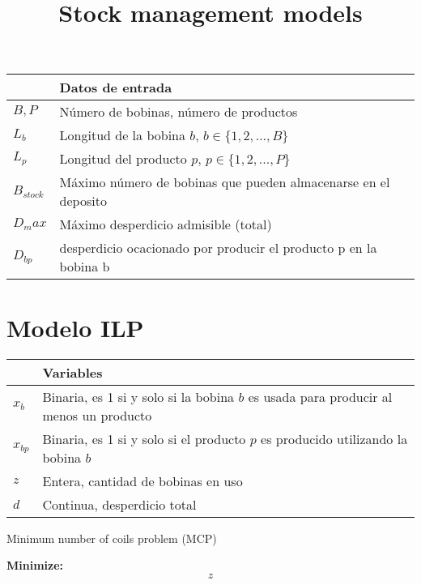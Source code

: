 \documentclass[12pt,a4paper,spanish]{article}
\title{Stock management models}
\begin{document}
\maketitle


\begin{center}

\begin{tabular}{ll}
\hline
 & \textbf{Datos de entrada}  \\
\hline
$B,P$ & Número de bobinas, número de productos\\
$L_b$ & Longitud de la bobina $b$, $b\in \{1,2,...,B\}$\\
$L_p$ & Longitud del producto $p$, $p\in \{1,2,...,P\}$\\
$B_{stock}$ & Máximo número de bobinas que pueden almacenarse en el deposito\\
$D_max$ & Máximo desperdicio admisible (total)\\
$D_{bp}$ & desperdicio ocacionado por producir el producto p en la bobina b \\

\hline
\end{tabular}
\end{center}


\section*{Modelo ILP}
\begin{center}
\begin{tabular}{ll}
\hline
 & \textbf{Variables}  \\
\hline
	$x_{b}$ & Binaria, es 1 si y solo si la bobina $b$ es usada para producir al menos un producto\\
	$x_{bp}$  & Binaria, es 1 si y solo si el producto $p$ es producido utilizando la bobina $b$\\
	$z $ & Entera, cantidad de bobinas en uso\\
	$d $ & Continua, desperdicio total\\
\hline
\end{tabular}

\end{center}

\bigskip

\newpage

\begin{center}
\large{Minimum number of coils problem (MCP)}
\end{center}

\textbf{Minimize:}
\begin{equation}
z
\label{eq_obj}
\end{equation}
\bigskip
\end{document}
